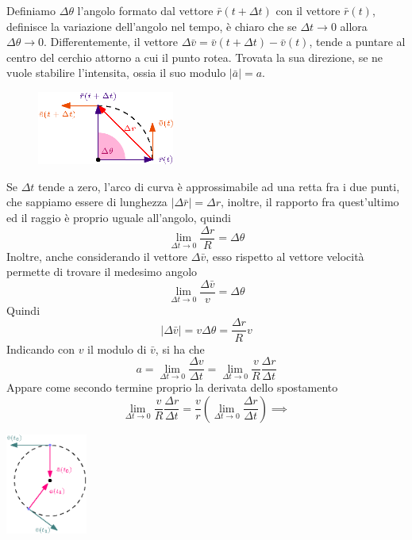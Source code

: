 \documentclass[10pt, letterpaper]{report}
\begin{document}
Definiamo $\Delta \theta$ l'angolo formato dal vettore $\bar r(t+\Delta t)$ con il vettore 
$\bar r(t)$, definisce la variazione dell'angolo nel tempo, è chiaro che se 
$\Delta t\rightarrow 0$ allora $\Delta \theta\rightarrow 0$.\acc 
Differentemente, il vettore $\Delta \bar v=\bar v(t+\Delta t)-\bar v(t)$, tende a puntare 
al centro del cerchio attorno a cui il punto rotea. Trovata la sua direzione, se ne vuole 
stabilire l'intensita, ossia il suo modulo $|\bar a|=a$.
\begin{center}
    \begin{figure}[h!]
        \centering
        \includegraphics[width=0.4\textwidth]{images/accAng.eps}
    \end{figure} 
\end{center}
Se $\Delta t$ tende a zero, l'arco di curva è approssimabile ad una retta fra i due punti, che 
sappiamo essere di lunghezza $|\Delta \bar r|=\Delta r$, inoltre, il rapporto fra quest'ultimo ed 
il raggio è proprio uguale all'angolo, quindi 
$$ \lim_{\Delta t \rightarrow 0}\frac{\Delta r}{R}=\Delta \theta $$
Inoltre, anche considerando il vettore $\Delta \bar v$, esso rispetto al vettore velocità 
permette di trovare il medesimo angolo 
$$ \lim_{\Delta t \rightarrow 0}\frac{\Delta \bar v}{v}=\Delta \theta $$
Quindi $$ |\Delta \bar v |= v\Delta \theta = \frac{\Delta r}{R}v$$
Indicando con $v$ il modulo di $\bar v$, si ha che 
$$ a=\lim_{\Delta t\rightarrow 0}\frac{\Delta v}{\Delta t}=
\lim_{\Delta t\rightarrow 0} \frac{v}{R}\frac{\Delta r}{\Delta t}$$
Appare come secondo termine proprio la derivata dello spostamento 
$$\lim_{\Delta t\rightarrow 0} \frac{v}{R}\frac{\Delta r}{\Delta t}= 
\frac{v}{r}(\lim_{\Delta t\rightarrow 0}\frac{\Delta r}{\Delta t})\implies  $$
\begin{center}
        \includegraphics[width=0.2\textwidth]{images/accelerazioneNormale.eps}
\end{center}
\end{document}
